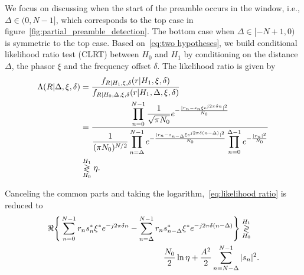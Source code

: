 
We focus on discussing when the start of the preamble 
occurs in the window, i.e., $\Delta\in(0,N{-}1]$, which corresponds to
the top case in figure~\ref{fig:partial_preamble_detection}.
The bottom case when 
$\Delta\in[-N{+}1,0)$ 
is symmetric to the top case.
Based on~\eqref{eq:two hypotheses}, we build conditional likelihood ratio test (CLRT)
between $H_0$ and $H_1$ by conditioning on the distance $\Delta$, 
the phasor $\xi$ and the frequency offset $\delta$. The likelihood ratio is given by
\begin{equation}
    \label{eq:likelihood ratio}
    \begin{aligned}
    \Lambda(R|\Delta,\xi,\delta)&=\frac{f_{R|H_1,\xi,\delta}(r|H_1,\xi,\delta)}{f_{R|H_0,\Delta,\xi,\delta}(r|H_1,\Delta,\xi,\delta)} \\
    &=\frac{\displaystyle \prod_{n=0}^{N-1}\frac{1}{\sqrt{\pi N_0}}e^{-\frac{|r_n-s_n\xi e^{j2\pi\delta n}|^2}{N_0}}}{\displaystyle \frac{1}{(\pi N_0)^{N/2}}\prod_{n=\Delta}^{N-1}e^{-\frac{|r_n-s_{n-\Delta}\xi e^{j2\pi\delta (n-\Delta)}|^2}{N_0}}\prod_{n=0}^{\Delta-1}e^{-\frac{|r_n|^2}{N_0}}} \\
    & \mathrel{\mathop\gtrless\limits^{H_1}_{H_0}} \eta.
    \end{aligned}
  \end{equation}

  Canceling the common parts and taking the logarithm,~\eqref{eq:likelihood ratio} is reduced to
\begin{equation}
    \label{eq:log likelihood}
    \begin{aligned}
    \Re\Bigg\{\sum_{n=0}^{N-1}r_ns_n^*\xi^*e^{-j2\pi\delta n}-\sum_{n=\Delta}^{N-1}r_n&s_{n-\Delta}^*\xi^*e^{-j2\pi\delta(n-\Delta)}\Bigg\} \mathrel{\mathop\gtrless\limits^{H_1}_{H_0}} \\
    &\frac{N_0}{2}\ln\eta+\frac{A^2}{2}\sum_{n=N-\Delta}^{N-1}|s_n|^2.
    \end{aligned}
\end{equation}

